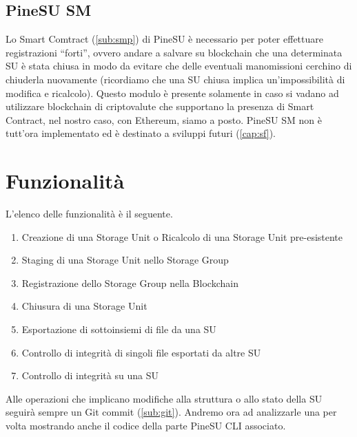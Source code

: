 \subsection{PineSU SM}
\label{sub:sm}
Lo Smart Comtract (\autoref{sub:smp}) di PineSU è necessario
per poter effettuare registrazioni “forti”, ovvero andare a salvare su blockchain
che una determinata SU è stata chiusa in modo da evitare che delle eventuali manomissioni
cerchino di chiuderla nuovamente (ricordiamo che una SU chiusa implica un’impossibilità di modifica e ricalcolo).
Questo modulo è presente solamente in caso si vadano ad utilizzare blockchain di criptovalute che
supportano la presenza di Smart Contract, nel nostro caso, con Ethereum, siamo a posto.
PineSU SM non è tutt’ora implementato ed è destinato a sviluppi futuri (\autoref{cap:sf}).

\newpage

\section{Funzionalità}

L’elenco delle funzionalità è il seguente.

\begin{enumerate}
    \item Creazione di una Storage Unit o Ricalcolo di una Storage Unit pre-esistente
    \item Staging di una Storage Unit nello Storage Group
    \item Registrazione dello Storage Group nella Blockchain
    \item Chiusura di una Storage Unit
    \item Esportazione di sottoinsiemi di file da una SU
    \item Controllo di integrità di singoli file esportati da altre SU
    \item Controllo di integrità su una SU
\end{enumerate}

Alle operazioni che implicano modifiche alla struttura o allo stato della SU seguirà sempre un Git \textsf{commit} (\autoref{sub:git}).
Andremo ora ad analizzarle una per volta mostrando anche il codice della parte PineSU CLI associato.

